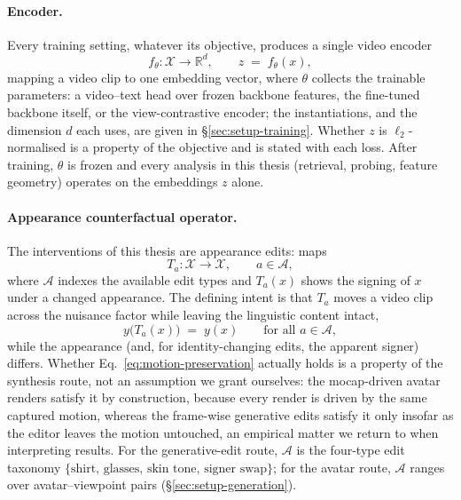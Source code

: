 \paragraph{Encoder.}
Every training setting, whatever its objective, produces a single video
encoder
\begin{equation}
\label{eq:encoder}
f_\theta : \mathcal{X} \to \mathbb{R}^{d},
\qquad z \;=\; f_\theta(x),
\end{equation}
mapping a video clip to one embedding vector, where $\theta$ collects the
trainable parameters: a video--text head over frozen backbone features,
the fine-tuned backbone itself, or the view-contrastive encoder; the
instantiations, and the dimension $d$ each uses, are given in
\S\ref{sec:setup-training}. Whether $z$ is $\ell_2$-normalised is a
property of the objective and is stated with each loss. After training,
$\theta$ is frozen and every analysis in this thesis (retrieval,
probing, feature geometry) operates on the embeddings $z$ alone.

\paragraph{Appearance counterfactual operator.}
The interventions of this thesis are appearance edits: maps
\begin{equation}
\label{eq:cf-operator}
T_a : \mathcal{X} \to \mathcal{X}, \qquad a \in \mathcal{A},
\end{equation}
where $\mathcal{A}$ indexes the available edit types and $T_a(x)$ shows
the signing of $x$ under a changed appearance. The defining intent is that
$T_a$ moves a video clip across the nuisance factor while leaving the linguistic
content intact,
\begin{equation}
\label{eq:motion-preservation}
y\bigl(T_a(x)\bigr) \;=\; y(x) \qquad \text{for all } a \in \mathcal{A},
\end{equation}
while the appearance (and, for identity-changing edits, the apparent
signer) differs. Whether Eq.~\eqref{eq:motion-preservation} actually
holds is a property of the synthesis route, not an assumption we grant
ourselves: the mocap-driven avatar renders satisfy it by construction,
because every render is driven by the same captured motion, whereas the
frame-wise generative edits satisfy it only insofar as the editor leaves the
motion untouched, an empirical matter we return to when interpreting
results. For the generative-edit route, $\mathcal{A}$ is
the four-type edit taxonomy $\{\text{shirt},\, \text{glasses},\,
\text{skin tone},\, \text{signer swap}\}$; for the avatar route,
$\mathcal{A}$ ranges over avatar--viewpoint pairs
(\S\ref{sec:setup-generation}).

